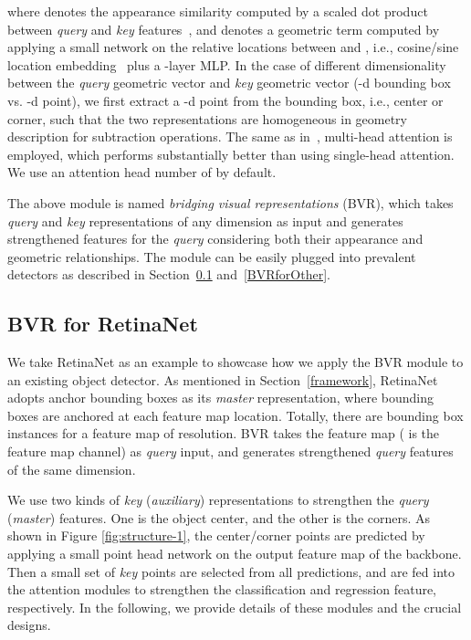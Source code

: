 \documentclass{article}
\def\ie{{i.e.}}
\begin{document}
where  denotes the appearance similarity computed by a scaled dot product between \emph{query} and \emph{key} features~\cite{vaswani2017attention,hu2018relation}, and  denotes a geometric term computed by applying a small network on the relative locations between  and , \ie, cosine/sine location embedding~\cite{vaswani2017attention,hu2018relation} plus a -layer MLP. In the case of different dimensionality between the \emph{query} geometric vector and \emph{key} geometric vector (-d bounding box vs. -d point), we first extract a -d point from the bounding box, \ie, center or corner, such that the two representations are homogeneous in geometry description for subtraction operations. The same as in~\cite{vaswani2017attention,hu2018relation}, multi-head attention is employed, which performs substantially better than using single-head attention. We use an attention head number of  by default.

The above module is named \emph{bridging visual representations} (BVR), which takes \emph{query} and \emph{key} representations of any dimension as input and generates strengthened features for the \emph{query} considering both their appearance and geometric relationships. The module can be easily plugged into prevalent detectors as described in Section~\ref{BVRforRetina} and~\ref{BVRforOther}.

\vspace*{-0.5em}

\subsection{BVR for RetinaNet}
\label{BVRforRetina}
\vspace*{-0.5em}

We take RetinaNet as an example to showcase how we apply the BVR module to an existing object detector. As mentioned in Section~\ref{framework}, RetinaNet adopts anchor bounding boxes as its \emph{master} representation, where  bounding boxes are anchored at each feature map location. Totally, there are  bounding box instances for a feature map of  resolution. BVR takes the  feature map ( is the feature map channel) as \emph{query} input, and generates strengthened \emph{query} features of the same dimension.

We use two kinds of \emph{key} (\emph{auxiliary}) representations to strengthen the \emph{query} (\emph{master}) features. One is the object center, and the other is the corners. As shown in Figure \ref{fig:structure-1}, the center/corner points are predicted by applying a small point head network on the output feature map of the backbone. Then a small set of \emph{key} points are selected from all predictions, and are fed into the attention modules to strengthen the classification and regression feature, respectively. In the following, we provide details of these modules and the crucial designs.
\end{document}
